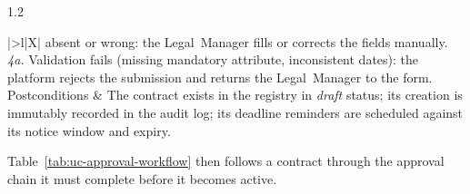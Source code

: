 \begin{spacing}{1.2}
{\begin{xltabular}{\linewidth}{|>{\bfseries}l|X|}
                      absent or wrong: the Legal~Manager fills or corrects
                      the fields manually. \textit{4a.} Validation fails
                      (missing mandatory attribute, inconsistent dates):
                      the platform rejects the submission and returns the
                      Legal~Manager to the form. \\ \hline
    Postconditions  & The contract exists in the registry in
                      \textit{draft} status; its creation is immutably
                      recorded in the audit log; its deadline reminders
                      are scheduled against its notice window and
                      expiry. \\ \hline
  \end{xltabular}}

Table~\ref{tab:uc-approval-workflow} then follows a contract through the
approval chain it must complete before it becomes active.


\end{spacing}
